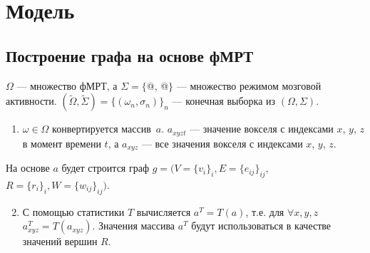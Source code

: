 \documentclass{beamer}
\makeatletter
\newcommand*{\rom}[1]{\expandafter\@slowromancap\romannumeral #1@}
\makeatother
\begin{document}
	\section{Модель}
		\subsection{Построение графа на основе фМРТ}
			\begin{frame}		
				$\Omega$ --- множество фМРТ, а $\Sigma = \{$\rom{1}, \rom{2}$\}$ --- множество режимом мозговой активности. $(\widetilde{\Omega}, \widetilde{\Sigma}) =  \{(\omega_{n}, \sigma_{n})\}_n$ --- конечная выборка из $(\Omega, \Sigma)$.		
				
				\begin{enumerate}
					\setcounter{enumi}{0}
					\item $\omega \in \Omega$ конвертируется массив~$a$. $a_{xyzt}$ --- значение вокселя с индексами $x$, $y$, $z$ в момент времени $t$, а $a_{xyz}$ --- все значения вокселя с индексами $x$, $y$, $z$.
				\end{enumerate}
				
				На основе $a$ будет строится граф $g = (V = \{v_i\}_i, E = \{e_{ij}\}_{ij},$\\$ R = \{r_i\}_i, W = \{w_{ij}\}_{ij})$.
				
				\begin{enumerate}
					\setcounter{enumi}{1}
					\item С помощью статистики $T$ вычисляется $a^{T} = T(a)$, т.е. для $\forall x, y, z$ $a^{T}_{xyz} = T(a_{xyz})$. Значения массива $a^{T}$ будут использоваться в качестве значений вершин $R$.					
				\end{enumerate}														
			\end{frame}
		
\end{document}

